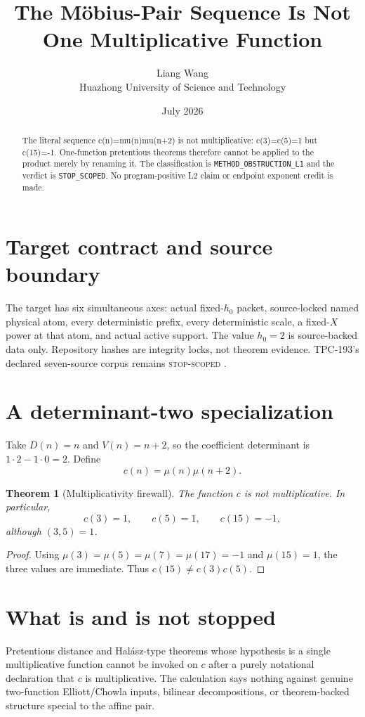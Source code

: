 \documentclass[11pt]{article}
\title{\textbf{The Möbius-Pair Sequence Is Not One Multiplicative Function}}
\author{Liang Wang\\Huazhong University of Science and Technology}
\date{July 2026}
\newtheorem{theorem}{Theorem}
\begin{document}
\maketitle
\begin{abstract}
The literal sequence c(n)=mu(n)mu(n+2) is not multiplicative: c(3)=c(5)=1 but c(15)=-1.  One-function pretentious theorems therefore cannot be applied to the product merely by renaming it.
The classification is \texttt{METHOD\_\allowbreak{}OBSTRUCTION\_\allowbreak{}L1} and the
verdict is \texttt{STOP\_\allowbreak{}SCOPED}.  No program-positive L2
claim or endpoint exponent credit is made.
\end{abstract}

\section{Target contract and source boundary}
The target has six simultaneous axes: actual fixed-\(h_0\) packet,
source-locked named physical atom, every deterministic prefix, every
deterministic scale, a fixed-\(X\) power at that atom, and actual active
support.  The value \(h_0=2\) is source-backed data only.  Repository hashes
are integrity locks, not theorem evidence.  TPC-193's declared seven-source
corpus remains \textsc{stop-scoped} \citep{WangTPC193}.


\section{A determinant-two specialization}
Take \(D(n)=n\) and \(V(n)=n+2\), so the coefficient determinant is
\(1\cdot2-1\cdot0=2\).  Define
\[
 c(n)=\mu(n)\mu(n+2).
\]

\begin{theorem}[Multiplicativity firewall]
The function \(c\) is not multiplicative.  In particular,
\[
 c(3)=1,\qquad c(5)=1,\qquad c(15)=-1,
\]
although \((3,5)=1\).
\end{theorem}
\begin{proof}
Using
\(\mu(3)=\mu(5)=\mu(7)=\mu(17)=-1\) and
\(\mu(15)=1\), the three values are immediate.  Thus
\(c(15)\ne c(3)c(5)\).
\end{proof}

\section{What is and is not stopped}
Pretentious distance and Hal\'asz-type theorems whose hypothesis is a
single multiplicative function cannot be invoked on \(c\) after a purely
notational declaration that \(c\) is multiplicative.  The calculation says
nothing against genuine two-function Elliott/Chowla inputs, bilinear
decompositions, or theorem-backed structure special to the affine pair.
\end{document}
